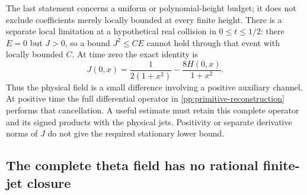 \documentclass[11pt]{article}
\numberwithin{equation}{section}
\theoremstyle{definition}
\theoremstyle{remark}
\begin{document}
The last statement concerns a uniform or polynomial-height budget;
it does not exclude coefficients merely locally bounded at every
finite height. There is a separate local limitation at a hypothetical
real collision in \(0\le t\le1/2\): there \(E=0\) but
\(J>0\), so a bound \(J^2\le C E\) cannot hold through that
event with locally bounded \(C\). At time zero the exact identity is
\begin{equation}
 J(0,x)=\frac{1}{2(1+x^2)}-\frac{8H(0,x)}{1+x^2}.
 \label{pp:primitive-time-zero}
\end{equation}
Thus the physical field is a small difference involving a positive
auxiliary channel. At positive time the full differential operator
in \eqref{pp:primitive-reconstruction} performs that cancellation.
A useful estimate must retain this complete operator and its signed
products with the physical jets. Positivity or separate derivative
norms of \(J\) do not give the required stationary lower bound.

\subsection{The complete theta field has no rational finite-jet closure}
\label{pp:closure-section}
\end{document}
